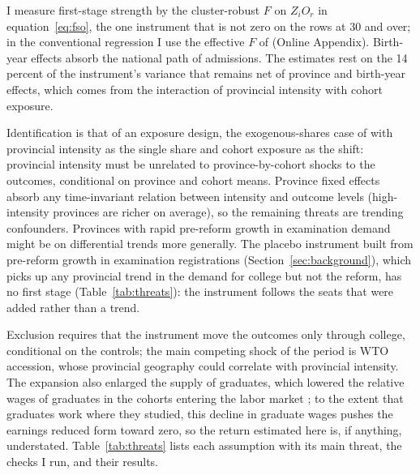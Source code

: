 \documentclass[11pt]{article}
\begin{document}
I measure first-stage strength by the cluster-robust $F$ on $Z_i O_r$ in equation~\eqref{eq:fso}, the one instrument that is not zero on the rows at 30 and over; in the conventional regression I use the effective $F$ of \citet{OleaPflueger2013} (Online Appendix). Birth-year effects absorb the national path of admissions. The estimates rest on the 14 percent of the instrument's variance that remains net of province and birth-year effects, which comes from the interaction of provincial intensity with cohort exposure.

Identification is that of an exposure design, the exogenous-shares case of
\citet{GoldsmithPinkham2020} with provincial intensity as the single share and cohort exposure as the shift: provincial intensity must be unrelated to
province-by-cohort shocks to the outcomes, conditional on province and
cohort means. Province fixed effects absorb any time-invariant relation
between intensity and outcome levels (high-intensity provinces are
richer on average), so the remaining threats are trending confounders.
Provinces with rapid pre-reform growth in examination demand might be on differential trends more generally. The placebo instrument built from pre-reform growth in examination registrations (Section~\ref{sec:background}), which picks up any provincial trend in the demand for college but not the reform, has no first stage (Table~\ref{tab:threats}): the instrument follows the seats that were added rather than a trend.

Exclusion requires that the instrument move the outcomes only through
college, conditional on the controls; the main
competing shock of the period is WTO accession, whose provincial
geography could correlate with provincial intensity. The expansion also enlarged the supply of graduates, which lowered the relative wages of graduates in the cohorts entering the labor market \citep{KnightDengLi2017}; to the extent that graduates work where they studied, this decline in graduate wages pushes the earnings reduced form toward zero, so the return estimated here is, if anything, understated. Table~\ref{tab:threats} lists each assumption with its main threat, the checks I run, and their results.
\end{document}
